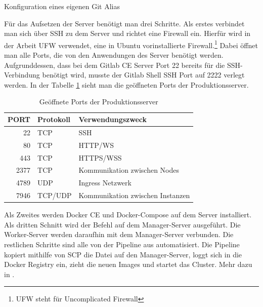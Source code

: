 \begin{listing}
    \inputminted{sh}{snippets/sh/pushall.sh}
    \caption{Konfiguration eines eigenen Git Alias}
    \label{lst:gitalias}
\end{listing}

Für das Aufsetzen der Server benötigt man drei Schritte.
Als erstes verbindet man sich über SSH zu dem Server und richtet eine Firewall ein.
Hierfür wird in der Arbeit UFW verwendet, eine in Ubuntu vorinstallierte
Firewall.\footnote{UFW steht für Uncomplicated Firewall} Dabei öffnet man alle Ports,
die von den Anwendungen des Server benötigt werden. Aufgrunddessen, dass bei dem Gitlab CE Server
Port 22 bereits für die SSH-Verbindung benötigt wird, musste der Gitlab Shell SSH
Port auf 2222 verlegt werden. In der Tabelle \ref{tab:geoeffneteportsderproduktionsserver}
sieht man die geöffneten Ports der Produktionsserver.

\begin{table}[h]
\begin{center}
\begin{tabular}{rll}
PORT & Protokoll & Verwendungszweck\\
\hline
22 & TCP & SSH\\
80 & TCP & HTTP/WS\\
443 & TCP & HTTPS/WSS\\
2377 & TCP & Kommunikation zwischen Nodes\\
4789 & UDP & Ingress Netzwerk\\
7946 & TCP/UDP & Kommunikation zwischen Instanzen\\
\end{tabular}
\end{center}
\caption{Geöffnete Ports der Produktionsserver}
\label{tab:geoeffneteportsderproduktionsserver}
\end{table}

Als Zweites werden Docker CE und Docker\hyp{}Compose
auf dem Server installiert. Als dritten Schnitt wird der Befehl
   auf dem Manager-Server
ausgeführt. Die Worker-Server werden daraufhin mit dem Manager-Server verbunden.
Die restlichen Schritte sind alle von der Pipeline aus automatisiert. Die Pipeline
kopiert mithilfe von SCP die  Datei auf den Manager-Server,
loggt sich in die Docker Registry ein, zieht die neuen Images und startet das Cluster.
Mehr dazu in .

